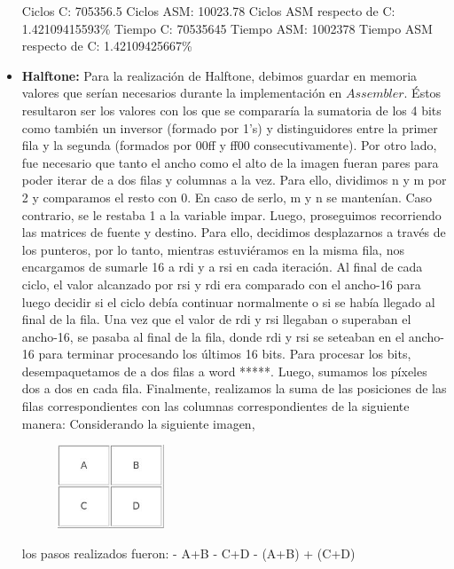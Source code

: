 \documentclass[10pt, a4paper]{article}
\begin{document}
\begin{itemize}
Ciclos C:                 705356.5\newline
Ciclos ASM:               10023.78\newline
Ciclos ASM respecto de C: 1.42109415593\% \newline
Tiempo C:                 70535645\newline
Tiempo ASM:               1002378\newline
Tiempo ASM respecto de C: 1.42109425667\% \newline

\item {\textbf{Halftone:}}
Para la realización de Halftone, debimos guardar en memoria valores que serían necesarios durante la implementación en $Assembler$. Éstos resultaron ser los valores con los que se compararía la sumatoria de los 4 bits como también un inversor (formado por 1's) y distinguidores entre la primer fila y la segunda (formados por 00ff y ff00 consecutivamente).\newline 
Por otro lado, fue necesario que tanto el ancho como el alto de la imagen fueran pares para poder iterar de a dos filas y columnas a la vez. Para ello, dividimos n y m por 2 y comparamos el resto con 0. En caso de serlo, m y n se mantenían. Caso contrario, se le restaba 1 a la variable impar.\newline
Luego, proseguimos recorriendo las matrices de fuente y destino. Para ello, decidimos desplazarnos a través de los punteros, por lo tanto, mientras estuviéramos en la misma fila, nos encargamos de sumarle 16 a rdi y a rsi en cada iteración. Al final de cada ciclo, el valor alcanzado por rsi y rdi era comparado con el ancho-16 para luego decidir si el ciclo debía continuar normalmente o si se había llegado al final de la fila. Una vez que el valor de rdi y rsi llegaban o superaban el ancho-16, se pasaba al final de la fila, donde rdi y rsi se seteaban en el ancho-16 para terminar procesando los últimos 16 bits.\newline
Para procesar los bits, desempaquetamos de a dos filas a word *****. Luego, sumamos los píxeles dos a dos en cada fila. Finalmente, realizamos la suma de las posiciones de las filas correspondientes con las columnas correspondientes de la siguiente manera:\newline
\newline
Considerando la siguiente imagen,
\begin{figure}[H] %
\begin{center}
\includegraphics[width=90pt]{./suma.jpg}
\end{center}
\end{figure}
los pasos realizados fueron:\newline
- A+B\newline
- C+D\newline
- (A+B) + (C+D)\newline


\end{itemize}
\end{document}
